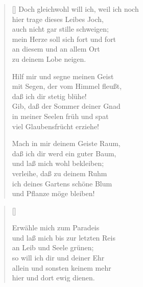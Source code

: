 \begin{multicols}{2}
\begin{verse}[\versewidth]
 Doch gleichwohl will ich, weil ich noch\\
hier trage dieses Leibes Joch,\\
auch nicht gar stille schweigen;\\
mein Herze soll sich fort und fort\\
an diesem und an allem Ort\\
zu deinem Lobe neigen.

 Hilf mir und segne meinen Geist\\
mit Segen, der vom Himmel fleußt,\\
daß ich dir stetig blühe!\\
Gib, daß der Sommer deiner Gnad\\
in meiner Seelen früh und spat\\
viel Glaubensfrücht erziehe!

 Mach in mir deinem Geiste Raum,\\
daß ich dir werd ein guter Baum,\\
und laß mich wohl bekleiben;\\
verleihe, daß zu deinem Ruhm\\
ich deines Gartens schöne Blum\\
und Pflanze möge bleiben!

\end{verse}
\end{multicols}

\begin{center}
\settowidth{\versewidth}{Der, vor dem die Welt erschrickt,}
\begin{verse}[\versewidth]

 Erwähle mich zum Paradeis\\
und laß mich bis zur letzten Reis\\
an Leib und Seele grünen;\\
so will ich dir und deiner Ehr\\
allein und sonsten keinem mehr\\
hier und dort ewig dienen.
  
\end{verse}
\end{center}


